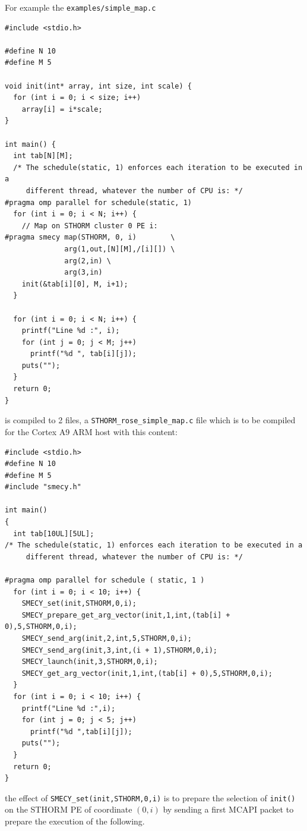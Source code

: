 \documentclass[a4paper]{article}
\begin{document}
For example the \verb|examples/simple_map.c|
\begin{lstlisting}
#include <stdio.h>

#define N 10
#define M 5

void init(int* array, int size, int scale) {
  for (int i = 0; i < size; i++)
    array[i] = i*scale;
}

int main() {
  int tab[N][M];
  /* The schedule(static, 1) enforces each iteration to be executed in a
     different thread, whatever the number of CPU is: */
#pragma omp parallel for schedule(static, 1)
  for (int i = 0; i < N; i++) {
    // Map on STHORM cluster 0 PE i:
#pragma smecy map(STHORM, 0, i)        \
              arg(1,out,[N][M],/[i][]) \
              arg(2,in) \
              arg(3,in)
    init(&tab[i][0], M, i+1);
  }

  for (int i = 0; i < N; i++) {
    printf("Line %d :", i);
    for (int j = 0; j < M; j++)
      printf("%d ", tab[i][j]);
    puts("");
  }
  return 0;
}
\end{lstlisting}
is compiled to 2 files, a \verb|STHORM_rose_simple_map.c| file which is
to be compiled for the Cortex A9 ARM host with this content:
\begin{lstlisting}
#include <stdio.h>
#define N 10
#define M 5
#include "smecy.h" 

int main()
{
  int tab[10UL][5UL];
/* The schedule(static, 1) enforces each iteration to be executed in a
     different thread, whatever the number of CPU is: */
  
#pragma omp parallel for schedule ( static, 1 )
  for (int i = 0; i < 10; i++) {
    SMECY_set(init,STHORM,0,i);
    SMECY_prepare_get_arg_vector(init,1,int,(tab[i] + 0),5,STHORM,0,i);
    SMECY_send_arg(init,2,int,5,STHORM,0,i);
    SMECY_send_arg(init,3,int,(i + 1),STHORM,0,i);
    SMECY_launch(init,3,STHORM,0,i);
    SMECY_get_arg_vector(init,1,int,(tab[i] + 0),5,STHORM,0,i);
  }
  for (int i = 0; i < 10; i++) {
    printf("Line %d :",i);
    for (int j = 0; j < 5; j++) 
      printf("%d ",tab[i][j]);
    puts("");
  }
  return 0;
}
\end{lstlisting}
the effect of \verb|SMECY_set(init,STHORM,0,i)| is to prepare the selection of
\texttt{init()} on the STHORM PE of coordinate $(0,i)$ by sending a first
MCAPI packet to prepare the execution of the following.
\end{document}
